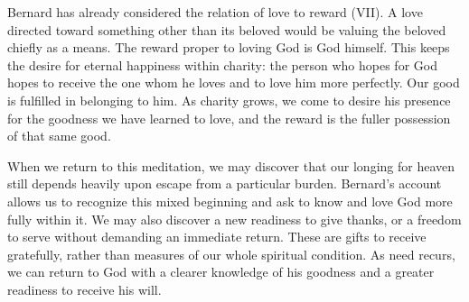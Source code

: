 Bernard has already considered the relation of love to reward (VII). A love directed toward something other than its beloved would be valuing the beloved chiefly as a means. The reward proper to loving God is God himself. This keeps the desire for eternal happiness within charity: the person who hopes for God hopes to receive the one whom he loves and to love him more perfectly. Our good is fulfilled in belonging to him. As charity grows, we come to desire his presence for the goodness we have learned to love, and the reward is the fuller possession of that same good.

When we return to this meditation, we may discover that our longing for heaven still depends heavily upon escape from a particular burden. Bernard's account allows us to recognize this mixed beginning and ask to know and love God more fully within it. We may also discover a new readiness to give thanks, or a freedom to serve without demanding an immediate return. These are gifts to receive gratefully, rather than measures of our whole spiritual condition. As need recurs, we can return to God with a clearer knowledge of his goodness and a greater readiness to receive his will.

